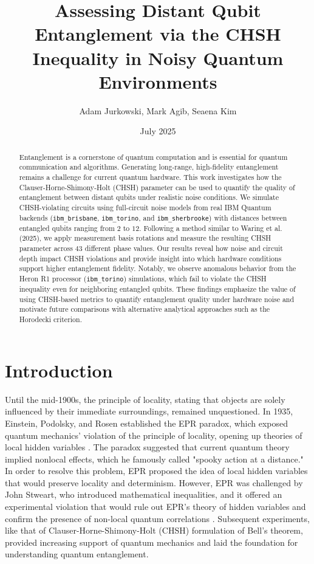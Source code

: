 \documentclass[a4paper, onecolumn, 11pt, titlepage]{quantumarticle}
\title{Assessing Distant Qubit Entanglement via the CHSH Inequality in Noisy Quantum Environments}
\author{Adam Jurkowski, Mark Agib, Seaena Kim}
\date{July 2025}
\begin{document}
\maketitle

\begin{abstract}
    Entanglement is a cornerstone of quantum computation and is essential for quantum communication and algorithms. Generating long-range, high-fidelity entanglement remains a challenge for current quantum hardware. This work investigates how the Clauser-Horne-Shimony-Holt (CHSH) parameter can be used to quantify the quality of entanglement between distant qubits under realistic noise conditions. We simulate CHSH-violating circuits using full-circuit noise models from real IBM Quantum backends (\verb|ibm_brisbane|, \verb|ibm_torino|, and \verb|ibm_sherbrooke|) with distances between entangled qubits ranging from $2$ to $12$. Following a method similar to Waring et al. (2025), we apply measurement basis rotations and measure the resulting CHSH parameter across $43$ different phase values. Our results reveal how noise and circuit depth impact CHSH violations and provide insight into which hardware conditions support higher entanglement fidelity. Notably, we observe anomalous behavior from the Heron R1 processor (\verb|ibm_torino|) simulations, which fail to violate the CHSH inequality even for neighboring entangled qubits. These findings emphasize the value of using CHSH-based metrics to quantify entanglement quality under hardware noise and motivate future comparisons with alternative analytical approaches such as the Horodecki criterion.
\end{abstract}



\section{Introduction}
Until the mid-1900s, the principle of locality, stating that objects are solely influenced by their immediate surroundings, remained unquestioned. In 1935, Einstein, Podolsky, and Rosen established the EPR paradox, which exposed quantum mechanics’ violation of the principle of locality, opening up theories of local hidden variables \cite{PhysRev.47.777}. The paradox suggested that current quantum theory implied nonlocal effects, which he famously called "spooky action at a distance." In order to resolve this problem, EPR proposed the idea of local hidden variables that would preserve locality and determinism. However, EPR was challenged by John Stweart, who introduced mathematical inequalities, and it offered an experimental violation that would rule out EPR's theory of hidden variables and confirm the presence of non-local quantum correlations \cite{PhysicsPhysiqueFizika.1.195}. Subsequent experiments, like that of Clauser-Horne-Shimony-Holt (CHSH) formulation of Bell's theorem, provided increasing support of quantum mechanics and laid the foundation for understanding quantum entanglement. 
\end{document}
